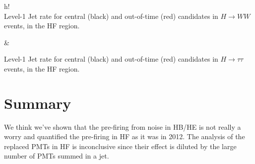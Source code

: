 \documentclass[11pt]{cmspaperpdf}
\begin{document}
\begin{2figures}{h!}
 \\
\caption{Level-1 Jet rate for central (black) and out-of-time (red) candidates in $ H \rightarrow WW$ events, in the HF region.}\label{fig:p3_hf}  &
\caption{Level-1 Jet rate for central (black) and out-of-time (red) candidates in $ H \rightarrow \tau \tau$ events, in the HF region.}\label{fig:p4_hf} 
\end{2figures}

\section{Summary}

We think we've shown that the pre-firing from noise in HB/HE is not really a worry and quantified the pre-firing in HF as it was in 2012. The analysis of the replaced PMTs in HF is inconclusive since their effect is diluted by the large number of PMTs summed in a jet. 
\end{document}
